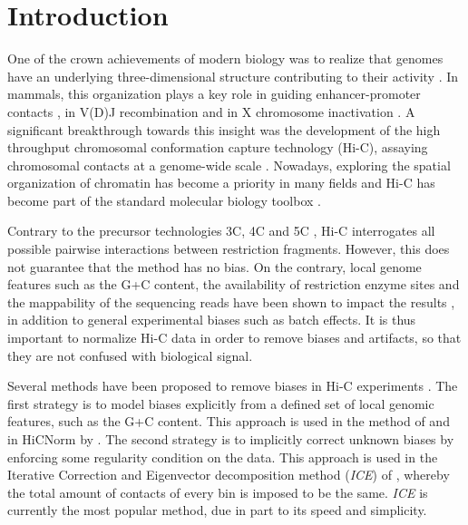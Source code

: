 \documentclass[a4,center,fleqn]{NAR}
\begin{document}
\section{Introduction}

One of the crown achievements of modern biology was to realize that
genomes have an underlying three-dimensional structure contributing to
their activity \citep{rowley2016three, dekker20163d, pezic2017more}. In
mammals, this organization plays a key role in guiding enhancer-promoter
contacts \citep{de2013topology}, in V(D)J recombination
\citep{choi2014ctcf} and in X chromosome inactivation \citep{galupa2015x}.
A significant breakthrough towards this insight was the development of
the high throughput chromosomal conformation capture technology (Hi-C),
assaying chromosomal contacts at a genome-wide scale
\citep{lieberman2009comprehensive}. Nowadays, exploring the spatial
organization of chromatin has become a priority in many fields and Hi-C
has become part of the standard molecular biology toolbox
\citep{dekker2013exploring}.

Contrary to the precursor technologies 3C, 4C and 5C
\citep{dekker2002capturing, simonis2006nuclear,
dostie2006chromosome,de2012decade}, Hi-C interrogates all possible
pairwise interactions between restriction fragments. However, this does
not guarantee that the method has no bias.  On the contrary, local genome
features such as the G+C content, the availability of restriction enzyme
sites and the mappability of the sequencing reads have been shown to
impact the results \citep{yaffe2011probabilistic}, in addition to general
experimental biases such as batch effects. It is thus important to
normalize Hi-C data in order to remove biases and artifacts, so that they
are not confused with biological signal.

Several methods have been proposed to remove biases in Hi-C experiments
\citep{schmitt2016genome}. The first strategy is to model biases
explicitly from a defined set of local genomic features, such as the G+C
content. This approach is used in the method of
\cite{yaffe2011probabilistic} and in HiCNorm by \cite{hu2012hicnorm}.
The second strategy is to implicitly correct unknown biases by enforcing
some regularity condition on the data. This approach is used in the
Iterative Correction and Eigenvector decomposition method (\textit{ICE})
of \cite{imakaev2012iterative}, whereby the total amount of contacts of
every bin is imposed to be the same. \textit{ICE} is currently the most
popular method, due in part to its speed and simplicity.
\end{document}
